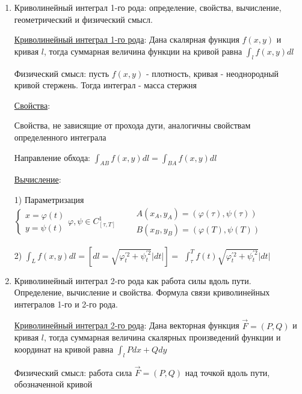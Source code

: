 \documentclass[12pt]{article}
\begin{document}
\begin{enumerate}
        \item Криволинейный интеграл 1-го рода: определение, свойства, вычисление, геометрический и физический смысл.

        \hyperlink{curvilinearintegraloffirstkind}{Криволинейный интеграл 1-го рода}: Дана скалярная функция $f(x, y)$ и кривая $l$, тогда суммарная величина функции на кривой равна $\int_l f(x, y) dl$

        Физический смысл: пусть $f(x, y)$ - плотность, кривая - неоднородный кривой стержень. Тогда интеграл - масса стержня

        \hyperlink{curvilinearintegraloffirstkindproperties}{Свойства}:

        Свойства, не зависящие от прохода дуги, аналогичны свойствам определенного интеграла

        Направление обхода: $\int_{AB} f(x, y)dl = \int_{BA} f(x, y)dl$

        \hyperlink{curvilinearintegraloffirstkindcalculation}{Вычисление}:

        1) Параметризация $\begin{cases}
            x = \varphi(t) \\
            y = \psi(t)
        \end{cases} \varphi, \psi \in C^1_{[\tau, T]} \quad\quad \begin{matrix}
            A(x_A, y_A) = (\varphi(\tau), \psi(\tau)) \\
            B(x_B, y_B) = (\varphi(T), \psi(T))
        \end{matrix}$

        2) $\int_{L} f(x, y) dl = \left[dl = \sqrt{\varphi_t^{\prime 2} + \psi_t^{\prime 2}}|dt|\right] = $
        $\int_\tau^T f(t) \sqrt{\varphi_t^{\prime 2} + \psi_t^{\prime 2}}|dt|$

        \item Криволинейный интеграл 2-го рода как работа силы вдоль пути. Определение, вычисление и свойства. Формула связи криволинейных интегралов 1-го и 2-го рода.

        \hyperlink{curvilinearintegralofsecondkind}{Криволинейный интеграл 2-го рода}:
        Дана векторная функция $\overrightarrow{F} = (P, Q)$ и кривая $l$, тогда суммарная величина скалярных произведений функции и координат на кривой равна $\int_{l} Pdx + Qdy$

        Физический смысл: работа сила $\overrightarrow{F} = (P, Q)$ над точкой вдоль пути, обозначенной кривой


\end{enumerate}
\end{document}
